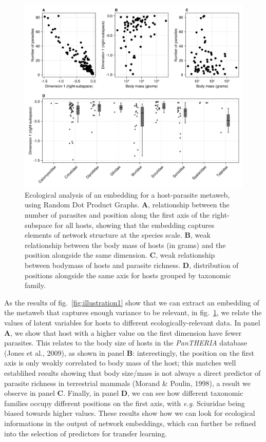 \documentclass[11pt]{article}
\makeatletter
\def\maxwidth{\ifdim\Gin@nat@width>\linewidth\linewidth
\else\Gin@nat@width\fi}
\let\Oldincludegraphics\includegraphics
\renewcommand{\includegraphics}[1]{\Oldincludegraphics[width=\maxwidth]{#1}}
\makeatother
\begin{document}
\begin{figure}
\hypertarget{fig:illustration2}{%
\centering
\includegraphics{figures/illustration-part2.png}
\caption{Ecological analysis of an embedding for a host-parasite
metaweb, using Random Dot Product Graphs. \textbf{A}, relationship
between the number of parasites and position along the first axis of the
right-subspace for all hosts, showing that the embedding captures
elements of network structure at the species scale. \textbf{B}, weak
relationship between the body mass of hosts (in grams) and the position
alongside the same dimension. \textbf{C}, weak relationship between
bodymass of hosts and parasite richness. \textbf{D}, distribution of
positions alongside the same axis for hosts grouped by taxonomic
family.}\label{fig:illustration2}
}
\end{figure}

As the results of fig.~\ref{fig:illustration1} show that we can extract
an embedding of the metaweb that captures enough variance to be
relevant, in fig.~\ref{fig:illustration2}, we relate the values of
latent variables for hosts to different ecologically-relevant data. In
panel \textbf{A}, we show that host with a higher value on the first
dimension have fewer parasites. This relates to the body size of hosts
in the \emph{PanTHERIA} database (Jones et al., 2009), as shown in panel
\textbf{B}: interestingly, the position on the first axis is only weakly
correlated to body mass of the host; this matches well establihed
results showing that body size/mass is not always a direct predictor of
parasite richness in terrestrial mammals (Morand \& Poulin, 1998), a
result we observe in panel \textbf{C}. Finally, in panel \textbf{D}, we
can see how different taxonomic families occupy different positions on
the first axis, with \emph{e.g.} Sciuridae being biased towards higher
values. These results show how we can look for ecological informations
in the output of network embeddings, which can further be refined into
the selection of predictors for transfer learning.
\end{document}
